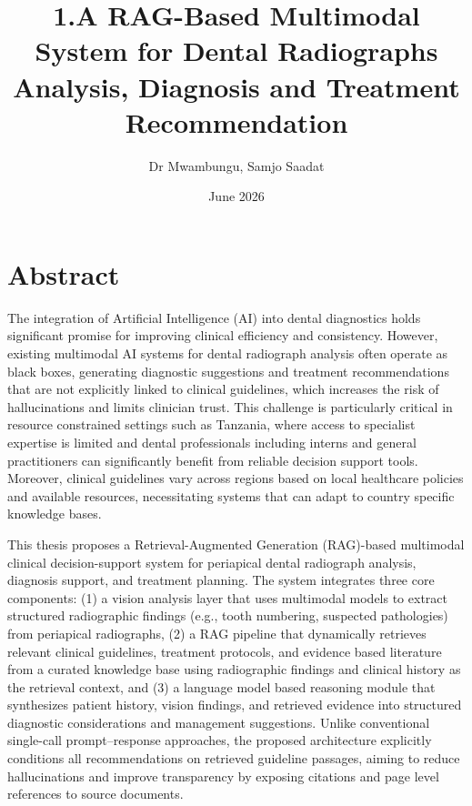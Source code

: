 \documentclass[12pt,a4paper]{report}
\title {1.A RAG-Based Multimodal System for Dental Radiographs Analysis, Diagnosis and Treatment Recommendation}
\author{Dr Mwambungu, Samjo Saadat}
\date{June 2026}
\begin{document}
	
	
	
	
	\chapter*{Abstract}
	
	The integration of Artificial Intelligence (AI) into dental diagnostics holds significant promise for improving clinical efficiency and consistency. However, existing multimodal AI systems for dental radiograph analysis often operate as black boxes, generating diagnostic suggestions and treatment recommendations that are not explicitly linked to clinical guidelines, which increases the risk of hallucinations and limits clinician trust. This challenge is particularly critical in resource constrained settings such as Tanzania, where access to specialist expertise is limited and dental professionals including interns and general practitioners can significantly benefit from reliable decision support tools. Moreover, clinical guidelines vary across regions based on local healthcare policies and available resources, necessitating systems that can adapt to country specific knowledge bases.
	
	This thesis proposes a Retrieval-Augmented Generation (RAG)-based multimodal clinical decision-support system for periapical dental radiograph analysis, diagnosis support, and treatment planning. The system integrates three core components: (1) a vision analysis layer that uses multimodal models to extract structured radiographic findings (e.g., tooth numbering, suspected pathologies) from periapical radiographs, (2) a RAG pipeline that dynamically retrieves relevant clinical guidelines, treatment protocols, and evidence based literature from a curated knowledge base using radiographic findings and clinical history as the retrieval context, and (3) a language model based reasoning module that synthesizes patient history, vision findings, and retrieved evidence into structured diagnostic considerations and management suggestions. Unlike conventional single-call prompt–response approaches, the proposed architecture explicitly conditions all recommendations on retrieved guideline passages, aiming to reduce hallucinations and improve transparency by exposing citations and page level references to source documents.
	
\end{document}
